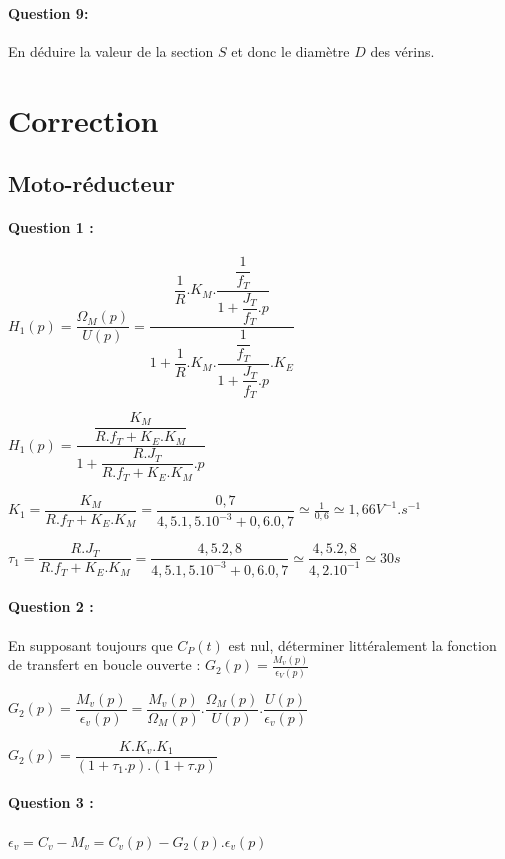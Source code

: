 \paragraph{Question 9:} En déduire la valeur de la section $S$ et donc le diamètre $D$ des vérins.

\ifdef{\public}{}{}

\newpage

\pagestyle{correction}

\section{Correction}

\subsection{Moto-réducteur}

\paragraph{Question 1 :} $H_1(p)=\dfrac{\Omega_M(p)}{U(p)}=\dfrac{\dfrac{1}{R}.K_M.\dfrac{\dfrac{1}{f_T}}{1+\dfrac{J_T}{f_T}.p}}{1+\dfrac{1}{R}.K_M.\dfrac{\dfrac{1}{f_T}}{1+\dfrac{J_T}{f_T}.p}.K_E}$

$H_1(p)=\dfrac{\dfrac{K_M}{R.f_T+K_E.K_M}}{1+\dfrac{R.J_T}{R.f_T+K_E.K_M}.p}$

$K_1=\dfrac{K_M}{R.f_T+K_E.K_M}=\dfrac{0,7}{4,5.1,5.10^{-3}+0,6.0,7}\simeq\frac{1}{0,6}\simeq1,66V^{-1}.s^{-1}$

$\tau_1=\dfrac{R.J_T}{R.f_T+K_E.K_M}=\dfrac{4,5.2,8}{4,5.1,5.10^{-3}+0,6.0,7}\simeq\dfrac{4,5.2,8}{4,2.10^{-1}}\simeq30s$

\paragraph{Question 2 :} En supposant toujours que $C_P(t)$ est nul, déterminer littéralement la fonction de transfert en boucle ouverte : $G_2(p)=\frac{M_v(p)}{\epsilon_V(p)}$	

$G_2(p)=\dfrac{M_v(p)}{\epsilon_v(p)}=\dfrac{M_v(p)}{\Omega_M(p)}.\dfrac{\Omega_M(p)}{U(p)}.\dfrac{U(p)}{\epsilon_v(p)}$

$G_2(p)=\dfrac{K.K_v.K_1}{(1+\tau_1.p).(1+\tau.p)}$

\paragraph{Question 3 :} $\epsilon_v=C_v-M_v=C_v(p)-G_2(p).\epsilon_v(p)$

